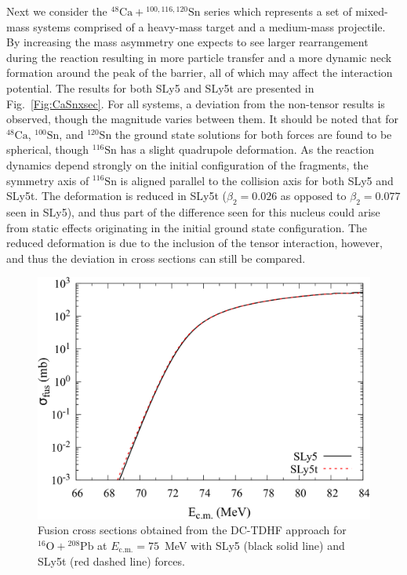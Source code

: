 Next we consider the $^{48}\mathrm{Ca}+\mathrm{^{100,116,120}Sn}$ series which represents a set of mixed-mass systems comprised of a heavy-mass target and a medium-mass projectile.
By increasing the mass asymmetry one expects to see larger rearrangement during the reaction resulting in more particle transfer and a more dynamic neck formation around the peak of the barrier, all of which may affect the interaction potential.
The results for both SLy5 and SLy5t are presented in Fig.~\ref{Fig:CaSnxsec}.
For all systems, a deviation from the non-tensor results is observed, though the magnitude varies between them.
It should be noted that for $^{48}\mathrm{Ca}$, $^{100}\mathrm{Sn}$, and $^{120}\mathrm{Sn}$ the ground state solutions for both forces are found to be spherical, though $^{116}\mathrm{Sn}$ has a slight quadrupole deformation.
As the reaction dynamics depend strongly on the initial configuration of the fragments, the symmetry axis of $^{116}\mathrm{Sn}$ is aligned parallel to the collision axis for both SLy5 and SLy5t.
The deformation is reduced in SLy5t ($\beta_2=0.026$ as opposed to $\beta_2=0.077$ seen in SLy5), and thus part of the difference seen for this nucleus could arise from static effects originating in the initial ground state configuration.
The reduced deformation is due to the inclusion of the tensor interaction, however, and thus the deviation in cross sections can still be compared.


\begin{figure}
\includegraphics[width=\textwidth]{../Figures/TensorXsec/CrossSections_O16Pb208.pdf}
\caption{Fusion cross sections obtained from the DC-TDHF approach for $^{16}\mathrm{O}+\mathrm{^{208}Pb}$ at $E_{\mathrm{c.m.}}=75$~MeV with SLy5 (black solid line) and SLy5t (red dashed line) forces.	\label{Fig:OPbxsec}}
\end{figure}

